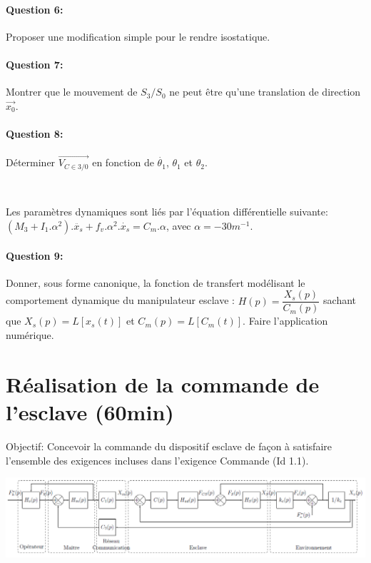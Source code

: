 \paragraph{Question 6:} Proposer une modification simple pour le rendre isostatique.

\paragraph{Question 7:} Montrer que le mouvement de $S_3/S_0$ ne peut être qu'une translation de direction $\overrightarrow{x_0}$.

\paragraph{Question 8:} Déterminer $\overrightarrow{V_{C\in3/0}}$ en fonction de $\dot{\theta_1}$, $\theta_1$  et $\theta_2$.

~\

Les paramètres dynamiques sont liés par l'équation différentielle suivante: \\ $(M_3+I_1.\alpha^2).\ddot{x_s}+f_v.\alpha^2.\dot{x_s}=C_m.\alpha$, avec $\alpha=-30m^{-1}$.

\paragraph{Question 9:} Donner, sous forme canonique, la fonction de transfert modélisant le comportement dynamique du manipulateur esclave : $H(p)=\dfrac{X_s(p)}{C_m(p)}$ sachant que $X_s(p)=L[x_s(t)]$ et $C_m(p)=L[C_m(t)]$. Faire l'application numérique.

\section{Réalisation de la commande de l'esclave (60min)}

Objectif: Concevoir la commande du dispositif esclave de façon à satisfaire l'ensemble des exigences incluses dans l'exigence \og Commande \fg (Id 1.1).

\begin{center}
 \includegraphics[width=0.9\linewidth]{img/Figure12}
\end{center}

